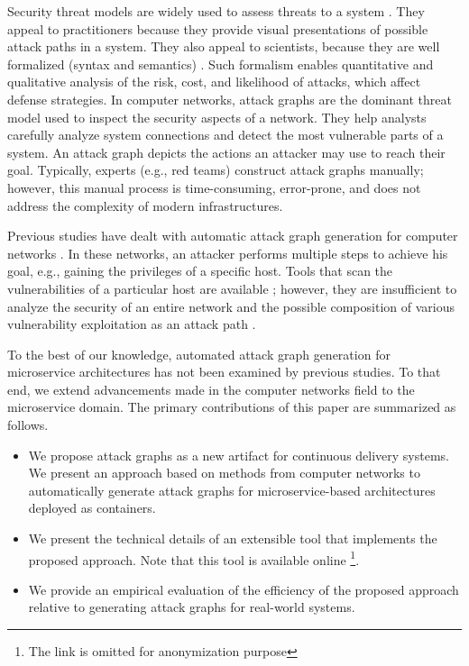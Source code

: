 Security threat models are widely used to assess threats to a system \cite{kordy2014dag}. They appeal to practitioners because they provide visual presentations of possible attack paths in a system. They also appeal to scientists, because they are well formalized (syntax and semantics) \cite{mauw2005foundations,jha2002two}. Such formalism enables quantitative and qualitative analysis of the risk, cost, and likelihood of attacks, which affect defense strategies. In computer networks, attack graphs \cite{sheyner2002automated,ou2006scalable} are the dominant threat model used to inspect the security aspects of a network. They help analysts carefully analyze system connections and detect the most vulnerable parts of a system. An attack graph depicts the actions an attacker may use to reach their goal. Typically, experts (e.g., red teams) construct attack graphs manually; however, this manual process is time-consuming, error-prone, and does not address the complexity of modern infrastructures.  %


Previous studies have dealt with automatic attack graph generation for computer networks \cite{ingols2006practical, sheyner2002automated, ou2006scalable}. In these networks, an attacker performs multiple steps to achieve his goal, e.g., gaining the privileges of a specific host. Tools that scan the vulnerabilities of a particular host are available \cite{farmer1990cops}; however, they are insufficient to analyze the security of an entire network and the possible composition of various vulnerability exploitation as an attack path \cite{sheyner2002automated}. 

To the best of our knowledge, automated attack graph generation for microservice architectures has not been examined by previous studies. To that end, we extend advancements made in the computer networks field to the microservice domain. The primary contributions of this paper are summarized as follows.
\begin{itemize}
	\item We propose attack graphs as a new artifact for continuous delivery systems. We present an approach based on methods from computer networks to automatically generate attack graphs for microservice-based architectures deployed as containers.   
	\item We present the technical details of an extensible tool that implements the proposed approach. Note that this tool is available online \footnote{The link is omitted for anonymization  purpose}.
	\item We provide an empirical evaluation of the efficiency of the proposed approach relative to generating attack graphs for real-world systems.
\end{itemize}



